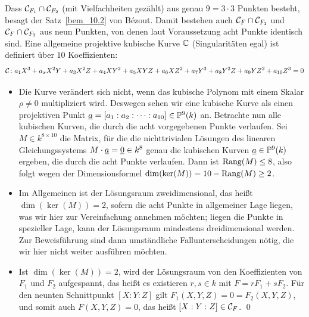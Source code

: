 \begin{bew}
	Dass $\mathcal{C}_{F_1} \cap \mathcal{C}_{F_2}$ (mit Vielfachheiten gezählt) aus genau $9 = 3 \cdot 3$ Punkten besteht, besagt der Satz~\ref{bem_10.2} von Bézout. 
	Damit bestehen auch $\mathcal{C}_F \cap \mathcal{C}_{F_1}$ und $\mathcal{C}_F \cap \mathcal{C}_{F_2}$ aus neun Punkten, von denen laut Voraussetzung acht Punkte identisch sind. 
	Eine allgemeine projektive kubische Kurve $\mathbb{C}$ (Singularitäten egal) ist definiert über $10$ Koeffizienten:
	\[\mathcal{C}\colon a_1X^3 + a_xX^2Y + a_3X^2Z + a_4XY^2 + a_5 XYZ + a_6 XZ^2 + a_7Y^3 + a_8Y^2Z + a_9YZ^2 + a_{10}Z^3 = 0\]
	\begin{itemize}
		\item Die Kurve verändert sich nicht, wenn das kubische Polynom mit einem Skalar $\rho \neq 0$ multipliziert wird.
		Deswegen sehen wir eine kubische Kurve als einen projektiven Punkt $\underline{a} = [a_1 : a_2 : \dots : a_{10}] \in \mathbb{P}^9(k)$ an.
		Betrachte nun alle kubischen Kurven, die durch die acht vorgegebenen Punkte verlaufen.
		Sei $M \in k^{8 \times 10}$ die Matrix, für die die nichttrivialen Lösungen des linearen Gleichungssystems $M \cdot \underline{a} = \underline{0} \in k^8$ genau die kubischen Kurven $\underline{a} \in \mathbb{P}^9(k)$ ergeben, die durch die acht Punkte verlaufen.
		Dann ist $\operatorname{Rang}(M) \leq 8$, also folgt wegen der Dimensionsformel $\dim(\ker(M)) = 10 - \operatorname{Rang}(M) \geq 2$.
		\item Im Allgemeinen ist der Lösungsraum zweidimensional, das heißt $\dim(\ker(M))=2$, sofern die acht Punkte in allgemeiner Lage liegen, was wir hier zur Vereinfachung annehmen möchten;
		liegen die Punkte in spezieller Lage, kann der Lösungsraum mindestens dreidimensional werden.
		Zur Beweisführung sind dann umständliche Fallunterscheidungen nötig, die wir hier nicht weiter ausführen möchten.
		\item Ist $\dim(\ker(M))=2$, wird der Lösungsraum von den Koeffizienten von $F_1$ und $F_2$ aufgespannt, das heißt es existieren $r,s \in k$ mit $F = rF_1 + sF_2$.
		Für den neunten Schnittpunkt $[X:Y:Z]$ gilt $F_1(X,Y,Z) = 0 = F_2(X,Y,Z)$, und somit auch $F(X,Y,Z) = 0$, das heißt $[X:Y:Z] \in \mathcal{C}_F$. \qed
	\end{itemize}
\end{bew}

